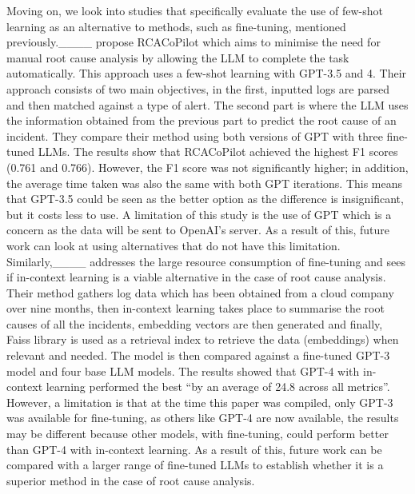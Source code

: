 Moving on, we look into studies that specifically evaluate the use of few-shot learning as an alternative to methods, such as fine-tuning, mentioned previously.____ propose RCACoPilot which aims to minimise the need for manual root cause analysis by allowing the LLM to complete the task automatically. This approach uses a few-shot learning with GPT-3.5 and 4. Their approach consists of two main objectives, in the first, inputted logs are parsed and then matched against a type of alert. The second part is where the LLM uses the information obtained from the previous part to predict the root cause of an incident. They compare their method using both versions of GPT with three fine-tuned LLMs. The results show that RCACoPilot achieved the highest F1 scores (0.761 and 0.766). However, the F1 score was not significantly higher; in addition, the average time taken was also the same with both GPT iterations. This means that GPT-3.5 could be seen as the better option as the difference is insignificant, but it costs less to use. A limitation of this study is the use of GPT which is a concern as the data will be sent to OpenAI's server. As a result of this, future work can look at using alternatives that do not have this limitation. Similarly,____ addresses the large resource consumption of fine-tuning and sees if in-context learning is a viable alternative in the case of root cause analysis. Their method gathers log data which has been obtained from a cloud company over nine months, then in-context learning takes place to summarise the root causes of all the incidents, embedding vectors are then generated and finally, Faiss library is used as a retrieval index to retrieve the data (embeddings) when relevant and needed. The model is then compared against a fine-tuned GPT-3 model and four base LLM models. The results showed that GPT-4 with in-context learning performed the best ``by an average of 24.8 across all metrics''. However, a limitation is that at the time this paper was compiled, only GPT-3 was available for fine-tuning, as others like GPT-4 are now available, the results may be different because other models, with fine-tuning, could perform better than GPT-4 with in-context learning. As a result of this, future work can be compared with a larger range of fine-tuned LLMs to establish whether it is a superior method in the case of root cause analysis.

